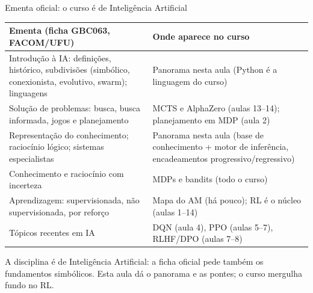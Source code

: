 \documentclass[aspectratio=169, 11pt]{beamer}
\begin{document}
\begin{frame}[shrink]{Ementa oficial: o curso é de Inteligência Artificial}
  \begin{center}
  \footnotesize
  \begin{tabular}{@{}p{7.6cm}p{5.2cm}@{}}
    \toprule
    \textbf{Ementa (ficha GBC063, FACOM/UFU)} & \textbf{Onde aparece no curso} \\
    \midrule
    Introdução à IA: definições, histórico, subdivisões (simbólico,
    conexionista, evolutivo, swarm); linguagens &
      Panorama nesta aula (Python é a linguagem do curso) \\
    Solução de problemas: busca, busca informada, jogos e planejamento &
      MCTS e AlphaZero (aulas 13–14); planejamento em MDP (aula 2) \\
    Representação do conhecimento; raciocínio lógico; sistemas
    especialistas &
      Panorama nesta aula (base de conhecimento + motor de inferência,
      encadeamentos progressivo/regressivo) \\
    Conhecimento e raciocínio com incerteza &
      MDPs e bandits (todo o curso) \\
    Aprendizagem: supervisionada, não supervisionada, por reforço &
      Mapa do AM (há pouco); RL é o núcleo (aulas 1–14) \\
    Tópicos recentes em IA &
      DQN (aula 4), PPO (aulas 5–7), RLHF/DPO (aulas 7–8) \\
    \bottomrule
  \end{tabular}
  \end{center}

  \begin{alertabox}
    A disciplina é de Inteligência Artificial: a ficha oficial pede
    também os fundamentos simbólicos. Esta aula dá o panorama e as
    pontes; o curso mergulha fundo no RL.
  \end{alertabox}
\end{frame}
\end{document}
